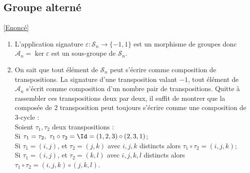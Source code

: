 \documentclass[8pt]{book}
\begin{document}
	\subsection{Groupe alterné }
	\label{Groupe alterné corrigé}
	\textcolor{blue}{\hyperref[Groupe alterné]{[Enoncé]}}\\
	\begin{enumerate}[leftmargin=*]
		\item L'application signature $\varepsilon :\mathcal S_n\to \{-1,1\}$ est un morphisme de groupes donc $\mathcal A_n=\ker \varepsilon$ est un sous-groupe de $\mathcal S_n$.
		\item On sait que tout élément de $\mathcal S_n$ peut s'écrire comme composition de transpositions. La signature d'une transposition valant $-1$, tout élément de $\mathcal A_n$ s'écrit comme composition d'un nombre pair de transpositions. Quitte à rassembler ces transpositions deux par deux, il suffit de montrer que la composée de $2$ transposition peut toujours s'écrire comme une composition de $3$-cycle :\\
		Soient $\tau_1,\tau_2$ deux transpositions :\\
		Si $\tau_1=\tau_2,\ \tau_1\circ\tau_2=\Id=(1,2,3)\circ(2,3,1)$;\\
		Si $\tau_1=(i,j)$, et $\tau_2=(j,k)$ avec $i,j,k$ distincts alors $\tau_1\circ\tau_2=(i,j,k)$;\\
		Si $\tau_1=(i,j)$, et $\tau_2=(k,l)$ avec $i,j,k,l$ distincts alors $\tau_1\circ\tau_2=(i,j,k)\circ(j,k,l)$.
	\end{enumerate}
	
\end{document}
